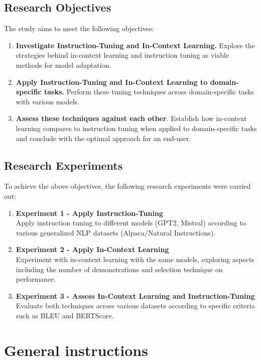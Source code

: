 \documentclass[11pt,a4paper]{article}
\begin{document}
\subsection{Research Objectives}
The study aims to meet the following objectives:
\begin{enumerate}
  \item \textbf{Investigate Instruction-Tuning and In-Context Learning.} Explore the strategies behind in-context learning and instruction tuning as viable methods for model adaptation. 
  \item \textbf{Apply Instruction-Tuning and In-Context Learning to domain-specific tasks.} Perform these tuning techniques across domain-specific tasks with various models.
  \item \textbf{Assess these techniques against each other}. Establish how in-context learning compares to instruction tuning when applied to domain-specific tasks and conclude with the optimal approach for an end-user.
\end{enumerate}

\subsection{Research Experiments}
To achieve the above objectives, the following research experiments were carried out:
\begin{enumerate}
  \item \textbf{Experiment 1 - Apply Instruction-Tuning}\\Apply instruction tuning to different models (GPT2, Mistral) according to various generalized NLP datasets (Alpaca/Natural Instructions).
  \item \textbf{Experiment 2 - Apply In-Context Learning}\\Experiment with in-context learning with the same models, exploring aspects including the number of demonstrations and selection technique 
  on performance. 
  \item \textbf{Experiment 3 - Assess In-Context Learning and Instruction-Tuning}\\Evaluate both techniques across various datasets according to specific criteria such as BLEU and BERTScore. 
\end{enumerate}


\fi


\section{General instructions}
\end{document}

